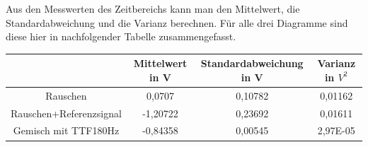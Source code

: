 \documentclass{scrartcl}						%
\begin{document}
\begin{itemize}
\begin{figure}[h!]
				\end{figure}
			\end{itemize}
			\clearpage
			Aus den Messwerten des Zeitbereichs kann man den Mittelwert, die Standardabweichung und die Varianz berechnen. Für alle drei Diagramme sind diese hier in nachfolgender Tabelle zusammengefasst.
			\center 
			\begin{tabular}{|c|c|c|c|}
			\hline  & Mittelwert in V & Standardabweichung in V & Varianz in $V^{2}$ \\ 
			\hline Rauschen & 0,0707 & 0,10782 & 0,01162 \\ 
			\hline Rauschen+Referenzsignal & -1,20722 & 0,23692 & 0,01611 \\ 
			\hline Gemisch mit TTF180Hz & -0,84358 & 0,00545 & 2,97E-05 \\ 
			\hline 
			\end{tabular} 
\end{document}
